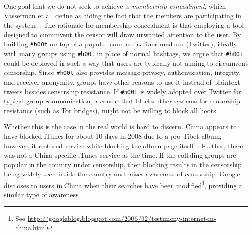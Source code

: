 \documentclass{sig-alternate-arxiv}
\newcommand{\hoot}{{\tt \#h00t}\xspace}
\newcommand{\msgs}{hoots\xspace}
\begin{document}
One goal that we do not seek to achieve is {\em membership concealment},
which Vasserman et al. define as hiding the fact that the members are
participating in the system~\cite{vasserman09mcon}. The rationale for
membership concealment is that employing a tool designed to circumvent
the censor will draw unwanted attention to the user. By building \hoot
on top of a popular communications medium (Twitter), ideally with many
groups using \hoot in place of normal hashtags, we argue that \hoot
could be deployed in such a way that users are typically not aiming to
circumvent censorship. Since \hoot also provides message privacy,
authentication, integrity, and receiver anonymity, groups have other
reasons to use it instead of plaintext tweets besides censorship
resistance. If \hoot is widely adopted over Twitter for typical group
communication, a censor that blocks other systems for
censorship-resistance (such as Tor bridges), might not be willing to
block all \msgs.

Whether this is the case in the real world is hard to discern. China
appears to have blocked iTunes for about 10 days in 2008 due to a
pro-Tibet album; however, it restored service while blocking the album
page itself~\cite{china-itunes}. Further, there was not a China-specific
iTunes service at the time. If the colliding groups are popular in the
country under censorship, then blocking results in the censorship being
widely seen inside the country and raises awareness of
censorship. Google discloses to users in China when their searches have
been modified\footnote{See
  \url{http://googleblog.blogspot.com/2006/02/testimony-internet-in-china.html}},
providing a similar type of awareness.








\end{document}

